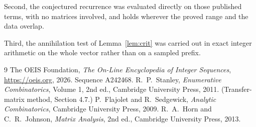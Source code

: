 \documentclass[11pt,a4paper]{article}
\theoremstyle{plain}
\theoremstyle{definition}
\begin{document}
Second, the conjectured recurrence was evaluated directly on those published terms, with no
matrices involved, and holds wherever the proved range and the data overlap.

Third, the annihilation test of Lemma~\ref{lem:crit} was carried out in exact integer
arithmetic on the whole vector rather than on a sampled prefix.

\begin{thebibliography}{9}
 The OEIS Foundation, \emph{The On-Line Encyclopedia of Integer
Sequences}, \url{https://oeis.org}, 2026. Sequence A242468.
 R.~P.~Stanley, \emph{Enumerative Combinatorics}, Volume 1, 2nd ed.,
Cambridge University Press, 2011. (Transfer-matrix method, Section 4.7.)
 P.~Flajolet and R.~Sedgewick, \emph{Analytic Combinatorics}, Cambridge
University Press, 2009.
 R.~A.~Horn and C.~R.~Johnson, \emph{Matrix Analysis}, 2nd ed., Cambridge
University Press, 2013.
\end{thebibliography}
\end{document}
